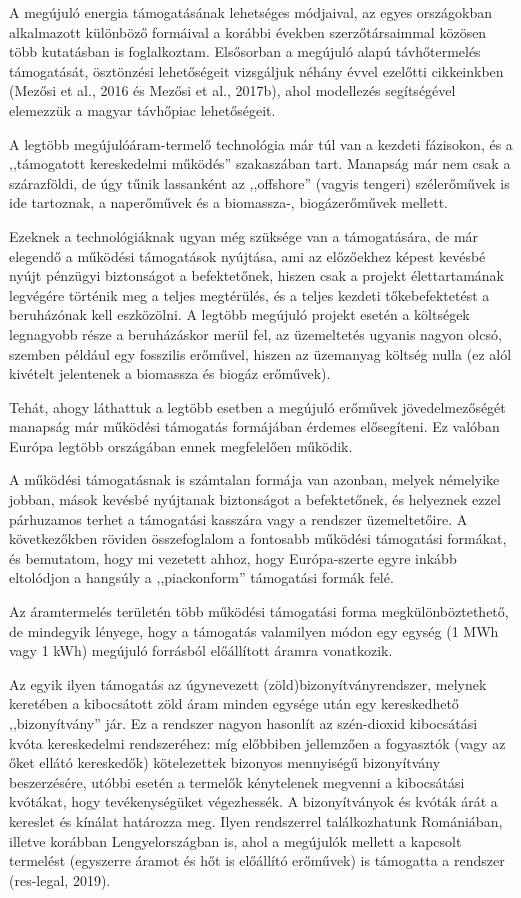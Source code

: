 \documentclass[twoside, magyar, showtrims]{corvinusphd}
\begin{document}
A megújuló energia támogatásának lehetséges módjaival,
az egyes országokban alkalmazott különböző formáival
a korábbi években szerzőtársaimmal közösen
több kutatásban is foglalkoztam. Elsősorban 
a megújuló alapú távhőtermelés támogatását,
ösztönzési lehetőségeit vizsgáljuk néhány évvel
ezelőtti cikkeinkben (Mezősi et al., 2016 és
Mezősi et al., 2017b), ahol modellezés segítségével
elemezzük a magyar távhőpiac lehetőségeit.

A legtöbb megújulóáram-termelő technológia
már túl van a kezdeti fázisokon,
és a ,,támogatott kereskedelmi működés'' szakaszában tart.
Manapság már nem csak a szárazföldi,
de úgy tűnik lassanként az ,,offshore''
(vagyis tengeri) szélerőművek is ide tartoznak,
a naperőművek és a biomassza-, biogázerőművek mellett.

Ezeknek a technológiáknak
ugyan még szüksége van a támogatására,
de már elegendő a működési
támogatások nyújtása, ami az előzőekhez
képest kevésbé nyújt pénzügyi biztonságot a befektetőnek,
hiszen csak a projekt élettartamának legvégére történik
meg a teljes megtérülés, és a teljes kezdeti tőkebefektetést
a beruházónak kell eszközölni. A legtöbb megújuló
projekt esetén a költségek legnagyobb része a beruházáskor merül fel,
az üzemeltetés ugyanis nagyon olcsó,
szemben például egy fosszilis erőművel, hiszen az üzemanyag költség nulla
(ez alól kivételt jelentenek a biomassza és biogáz erőművek).

Tehát, ahogy láthattuk a legtöbb esetben a
megújuló erőművek jövedelmezőségét
manapság már működési támogatás
formájában érdemes elősegíteni. Ez valóban Európa
legtöbb országában ennek megfelelően működik.

A működési támogatásnak is
számtalan formája van azonban, melyek némelyike jobban, mások kevésbé
nyújtanak biztonságot a befektetőnek, és helyeznek ezzel párhuzamos terhet
a támogatási kasszára vagy a rendszer üzemeltetőire.
A következőkben röviden összefoglalom a fontosabb működési támogatási formákat,
és bemutatom, hogy mi vezetett ahhoz,
hogy Európa-szerte egyre inkább eltolódjon a hangsúly
a ,,piackonform'' támogatási formák felé.

Az áramtermelés területén több
működési támogatási forma megkülönböztethető,
de mindegyik lényege, hogy a támogatás valamilyen
módon egy egység (1 MWh vagy 1 kWh)
megújuló forrásból előállított áramra vonatkozik.

Az egyik ilyen támogatás az úgynevezett
(zöld)bizonyítványrendszer, melynek keretében
a kibocsátott zöld áram minden egysége után
egy kereskedhető ,,bizonyítvány'' jár.
Ez a rendszer nagyon hasonlít az 
szén-dioxid kibocsátási kvóta kereskedelmi rendszeréhez:
míg előbbiben jellemzően a fogyasztók
(vagy az őket ellátó kereskedők)
kötelezettek bizonyos mennyiségű bizonyítvány
beszerzésére, utóbbi esetén a termelők
kénytelenek megvenni a kibocsátási kvótákat,
hogy tevékenységüket végezhessék.
A bizonyítványok és kvóták árát a kereslet és kínálat
határozza meg. Ilyen rendszerrel találkozhatunk
Romániában, illetve korábban
Lengyelországban is, ahol a megújulók mellett
a kapcsolt termelést (egyszerre áramot és hőt 
is előállító erőművek) is támogatta a rendszer (res-legal, 2019).
\end{document}
